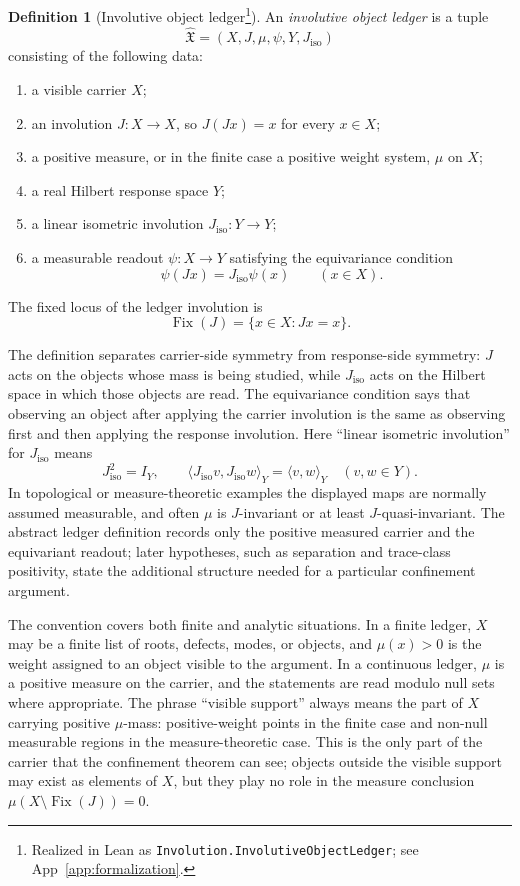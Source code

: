 \documentclass[11pt]{article}
\DeclareMathOperator{\Fix}{Fix}
\newcommand{\Jiso}{J_{\mathrm{iso}}}
\newcommand{\IOL}{\hat{\mathfrak{X}}}
\theoremstyle{definition}
\newtheorem{definition}[theorem]{Definition}
\begin{document}
\begin{definition}[Involutive object ledger\protect\footnote{Realized in Lean as \nolinkurl{Involution.InvolutiveObjectLedger}; see App~\ref{app:formalization}.}]
\label{def:duality_confinement:involutive-object-ledger}
An \emph{involutive object ledger} is a tuple
\[
  \IOL=(X,J,\mu,\psi,Y,\Jiso)
\]
consisting of the following data:
\begin{enumerate}
  \item a visible carrier \(X\);
  \item an involution \(J:X\to X\), so \(J(Jx)=x\) for every
    \(x\in X\);
  \item a positive measure, or in the finite case a positive weight
    system, \(\mu\) on \(X\);
  \item a real Hilbert response space \(Y\);
  \item a linear isometric involution \(\Jiso:Y\to Y\);
  \item a measurable readout \(\psi:X\to Y\) satisfying the
    equivariance condition
    \[
      \psi(Jx)=\Jiso\psi(x)
      \qquad (x\in X).
    \]
\end{enumerate}
The fixed locus of the ledger involution is
\[
  \Fix(J)=\{x\in X: Jx=x\}.
\]
\end{definition}

The definition separates carrier-side symmetry from response-side
symmetry: \(J\) acts on the objects whose mass is being studied,
while \(\Jiso\) acts on the Hilbert space in which those objects
are read.  The equivariance condition says that observing an
object after applying the carrier involution is the same as
observing first and then applying the response involution.  Here
``linear isometric involution'' for \(\Jiso\) means
\[
  \Jiso^2=I_Y,
  \qquad
  \langle \Jiso v,\Jiso w\rangle_Y=\langle v,w\rangle_Y
  \quad(v,w\in Y).
\]
In topological or measure-theoretic examples the displayed maps are
normally assumed measurable, and often \(\mu\) is \(J\)-invariant
or at least \(J\)-quasi-invariant.  The abstract ledger definition
records only the positive measured carrier and the equivariant
readout; later hypotheses, such as separation and trace-class
positivity, state the additional structure needed for a particular
confinement argument.

The convention covers both finite and analytic situations.  In a
finite ledger, \(X\) may be a finite list of roots, defects, modes,
or objects, and \(\mu(x)>0\) is the weight assigned to an object
visible to the argument.  In a continuous ledger, \(\mu\) is a
positive measure on the carrier, and the statements are read modulo
null sets where appropriate.  The phrase ``visible support'' always
means the part of \(X\) carrying positive \(\mu\)-mass:
positive-weight points in the finite case and non-null measurable
regions in the measure-theoretic case.  This is the only part of
the carrier that the confinement theorem can see; objects outside
the visible support may exist as elements of \(X\), but they play
no role in the measure conclusion
\(\mu(X\setminus\Fix(J))=0\).
\end{document}
